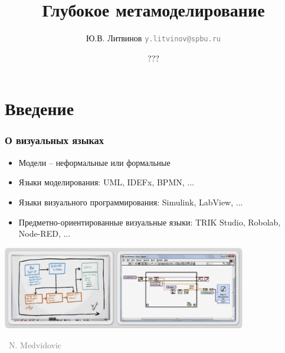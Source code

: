 \documentclass[xetex,mathserif,serif]{beamer}
\title{Глубокое метамоделирование}
\author[Юрий Литвинов]{Ю.В. Литвинов \newline 
	\textcolor{gray}{\small\texttt{y.litvinov@spbu.ru}}
}
\date{???}
\newcommand{\attribution}[1] {
\vspace{-5mm}\begin{flushright}\begin{scriptsize}\textcolor{gray}{\textcopyright\, #1}\end{scriptsize}\end{flushright}
}
\begin{document}
	\frame{\titlepage}

	\section{Введение}

	\begin{frame}
		\frametitle{О визуальных языках}
		\begin{itemize}
			\item Модели -- неформальные или формальные
			\item Языки моделирования: UML, IDEFx, BPMN, ...
			\item Языки визуального программирования: Simulink, LabView, ...
			\item Предметно-ориентированные визуальные языки: TRIK Studio, Robolab, Node-RED, ...
		\end{itemize}
		\begin{center}
			\includegraphics[width=0.8\textwidth]{sketchesVsFormalNotations.png}
			\attribution{N. Medvidovic}
		\end{center}
	\end{frame}
\end{document}
